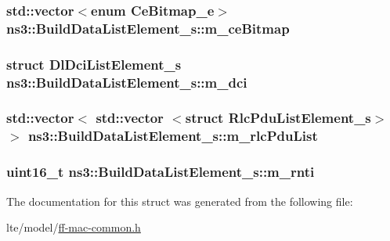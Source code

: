 \subsubsection[{\texorpdfstring{m\+\_\+ce\+Bitmap}{m_ceBitmap}}]{\setlength{\rightskip}{0pt plus 5cm}std\+::vector$<$enum {\bf Ce\+Bitmap\+\_\+e}$>$ ns3\+::\+Build\+Data\+List\+Element\+\_\+s\+::m\+\_\+ce\+Bitmap}\hypertarget{structns3_1_1BuildDataListElement__s_affc8104dae3a75d16e84bc3ab954cd7e}{}\label{structns3_1_1BuildDataListElement__s_affc8104dae3a75d16e84bc3ab954cd7e}
\subsubsection[{\texorpdfstring{m\+\_\+dci}{m_dci}}]{\setlength{\rightskip}{0pt plus 5cm}struct {\bf Dl\+Dci\+List\+Element\+\_\+s} ns3\+::\+Build\+Data\+List\+Element\+\_\+s\+::m\+\_\+dci}\hypertarget{structns3_1_1BuildDataListElement__s_ad0148c3da328bbddd264f174e026718f}{}\label{structns3_1_1BuildDataListElement__s_ad0148c3da328bbddd264f174e026718f}
\subsubsection[{\texorpdfstring{m\+\_\+rlc\+Pdu\+List}{m_rlcPduList}}]{\setlength{\rightskip}{0pt plus 5cm}std\+::vector$<$ std\+::vector $<$struct {\bf Rlc\+Pdu\+List\+Element\+\_\+s}$>$ $>$ ns3\+::\+Build\+Data\+List\+Element\+\_\+s\+::m\+\_\+rlc\+Pdu\+List}\hypertarget{structns3_1_1BuildDataListElement__s_aefcb545ea5b4a7a8f0b54acae824e95a}{}\label{structns3_1_1BuildDataListElement__s_aefcb545ea5b4a7a8f0b54acae824e95a}
\subsubsection[{\texorpdfstring{m\+\_\+rnti}{m_rnti}}]{\setlength{\rightskip}{0pt plus 5cm}uint16\+\_\+t ns3\+::\+Build\+Data\+List\+Element\+\_\+s\+::m\+\_\+rnti}\hypertarget{structns3_1_1BuildDataListElement__s_a79778ce303b4c73fd10df582b015361f}{}\label{structns3_1_1BuildDataListElement__s_a79778ce303b4c73fd10df582b015361f}


The documentation for this struct was generated from the following file\+:\begin{DoxyCompactItemize}
\item 
lte/model/\hyperlink{ff-mac-common_8h}{ff-\/mac-\/common.\+h}\end{DoxyCompactItemize}
